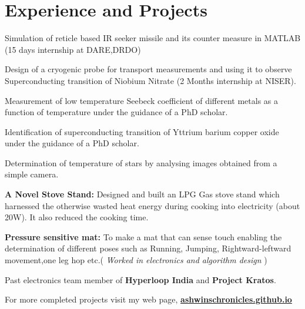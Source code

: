 \documentclass[]{deedy-resume-openfont}
\begin{document}
\hfill
\begin{minipage}[t]{0.66\textwidth} 


\section{Experience and Projects}

\vspace{\topsep} %

\begin{tightemize}
    \item Simulation of reticle based IR seeker missile and its counter measure in MATLAB (15 days internship at DARE,DRDO)
    \item Design of a cryogenic probe for transport measurements and using it to observe Superconducting transition of Niobium Nitrate (2 Months internship at NISER).
    
    \item Measurement of low temperature Seebeck coefficient of different metals as a function of temperature under the guidance of a PhD scholar.
    \item Identification of superconducting transition of Yttrium barium copper oxide under the guidance of a PhD scholar.
    \item Determination of temperature of stars by analysing images obtained from a simple camera. 
 
 \item \textbf{A Novel Stove Stand:} 
   Designed and built an LPG Gas stove stand which harnessed the otherwise  wasted heat energy 
 during cooking into electricity (about 20W). It also reduced the cooking time. 
 \item \textbf{Pressure sensitive mat:}
    To make a mat that can sense touch enabling the determination of  different poses such as Running, Jumping, Rightward-leftward movement,one leg hop etc.( \textit{Worked in electronics and algorithm design }) 
    \item Past electronics team member of \textbf{Hyperloop India} and \textbf{Project Kratos}.
   \item For more completed projects visit my web page, \href{https://ashwinschronicles.github.io/}{\textbf{ashwinschronicles.github.io} }
\end{tightemize}


\end{minipage}
\end{document}
